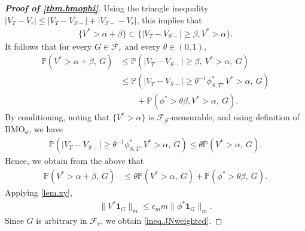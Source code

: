 \documentclass[12pt,oneside,reqno,fleqn]{amsart}
\numberwithin{equation}{section}
\theoremstyle{remark}
\newcommand\cff{{\mathcal F}}
\newcommand\PP{{\mathbb P}}
\newcommand{\1}{{\mathbf 1}}
\renewcommand{\le}{\leq}
\renewcommand{\ge}{\geq}
\newcommand{\bmo}{{\mathrm{BMO}}}
\begin{document}
\begin{proof}[\bf Proof of \cref{thm.bmophi}]
		Using the triangle inequality $|V_T-V_r|\le|V_T-V_{S-}|+|V_{S-}-V_r|$, this implies that
		\begin{align*}
			\{V^*> \alpha+\beta\}\subset\{|V_T-V_{S-}|\ge \beta, V^*> \alpha\}.
		\end{align*}
		It follows that for every $G\in\cff_r$ and every $\theta\in(0,1)$,
		\begin{align*}
			\PP(V^*>\alpha+\beta,\ G)
			&\le \PP(|V_T-V_{S-}|\ge \beta,\ V^*>\alpha,\ G)
			\\&\le \PP(|V_T-V_{S-}|\ge \theta^{-1}\phi^*_{S,T},V^*>\alpha,\ G)
			\\&\qquad+\PP( \phi^*> \theta \beta,V^*>\alpha,\ G).
		\end{align*}
		By conditioning, noting that $\{V^*>\alpha\}$ is $\cff_S$-measurable, and using definition of $\bmo_\phi$, we have
		\begin{align*}
			\PP(|V_T-V_{S-}|\ge \theta^{-1}\phi^*_{S,T},V^*>\alpha,\ G)\le \theta\PP(V^*>\alpha,\ G).
		\end{align*}
		Hence, we obtain from the above that
		\begin{align*}
			\PP(V^*> \alpha+\beta,\ G)
			&\le \theta\PP(V^*> \alpha,\ G)+\PP( \phi^*> \theta \beta,\ G).
		\end{align*}
		Applying \cref{lem.xy},
		\begin{align*}
			\|V^*\1_G\|_m\le c_mm\|\phi^*\1_G\|_m.
		\end{align*}
		Since $G$ is arbitrary in $\cff_r$, we obtain \eqref{ineq.JNweighted}.


\end{proof}
\end{document}
